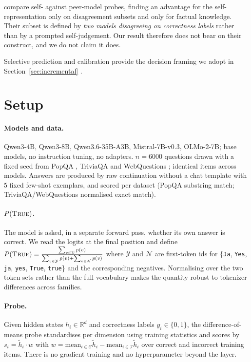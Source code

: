 \documentclass[10pt]{article}
\newcommand{\ptrue}{P(\textsc{True})}
\begin{document}
\citet{masked2026} compare self- against peer-model probes, finding an advantage for the
self-representation only on disagreement subsets and only for factual knowledge. Their subset is
defined by \emph{two models disagreeing on correctness labels} rather than by a prompted
self-judgement. Our result therefore does not bear on their construct, and we do not claim it
does.

Selective prediction and calibration provide the decision framing we adopt in
Section~\ref{sec:incremental} \citep{geifman2017selective,guo2017calibration}.

\section{Setup}
\label{sec:setup}

\paragraph{Models and data.} Qwen3-4B, Qwen3-8B, Qwen3.6-35B-A3B, Mistral-7B-v0.3, OLMo-2-7B; base
models, no instruction tuning, no adapters. $n=6000$ questions drawn with a fixed seed from PopQA
\citep{mallen2023popqa}, TriviaQA \citep{joshi2017triviaqa} and WebQuestions
\citep{berant2013webq}; identical items across models. Answers are produced by raw continuation
without a chat template with 5 fixed few-shot exemplars, and scored per dataset (PopQA substring
match; TriviaQA/WebQuestions normalised exact match).

\paragraph{$\ptrue{}$.} The model is asked, in a separate forward pass, whether its own answer is
correct. We read the logits at the final position and define
$\ptrue{} = \frac{\sum_{v \in \mathcal{Y}} p(v)}{\sum_{v \in \mathcal{Y}} p(v) + \sum_{v \in \mathcal{N}} p(v)}$
where $\mathcal{Y}$ and $\mathcal{N}$ are first-token ids for
\{\texttt{Ja}, \texttt{Yes}, \texttt{ja}, \texttt{yes}, \texttt{True}, \texttt{true}\} and the
corresponding negatives. Normalising over the two token sets rather than the full vocabulary makes
the quantity robust to tokenizer differences across families.

\paragraph{Probe.} Given hidden states $h_i \in \mathbb{R}^d$ and correctness labels
$y_i \in \{0,1\}$, the difference-of-means probe standardises per dimension using training
statistics and scores by $s_i = \tilde h_i \cdot w$ with
$w = \mathrm{mean}_{i \in \mathcal{C}} \tilde h_i - \mathrm{mean}_{i \in \mathcal{I}} \tilde h_i$
over correct and incorrect training items. There is no gradient training and no hyperparameter
beyond the layer.
\end{document}
